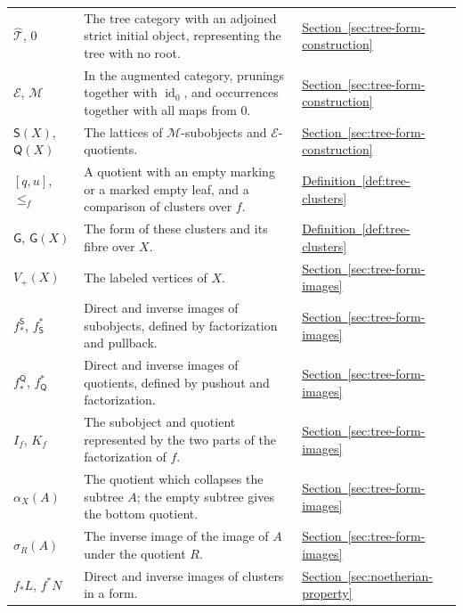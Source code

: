 \documentclass[11pt,a4paper]{article}
\theoremstyle{plain}
\theoremstyle{definition}
\theoremstyle{remark}
\newcommand{\id}{\operatorname{id}}
\begin{document}
\begin{longtable}{@{}>{\raggedright\arraybackslash}p{}
                    >{\raggedright\arraybackslash}p{}
                    >{\raggedright\arraybackslash}p{}@{}}
$\widehat{\mathcal T}$, $0$ & The tree category with an adjoined
  strict initial object, representing the tree with no root.
  & \hyperref[not:augmented-tree-category]{Section~\ref*{sec:tree-form-construction}}\\
$\mathcal E$, $\mathcal M$ & In the augmented category, prunings
  together with $\id_0$, and occurrences together with all maps
  from $0$.
  & \hyperref[not:augmented-tree-classes]{Section~\ref*{sec:tree-form-construction}}\\
$\mathsf S(X)$, $\mathsf Q(X)$ & The lattices of
  $\mathcal M$-subobjects and $\mathcal E$-quotients.
  & \hyperref[not:tree-subobjects-quotients]{Section~\ref*{sec:tree-form-construction}}\\
$[q,u]$, $\le_f$ & A quotient with an empty marking or a marked
  empty leaf, and a comparison of clusters over $f$.
  & \hyperref[def:tree-clusters]{Definition~\ref*{def:tree-clusters}}\\
$\mathsf G$, $\mathsf G(X)$ & The form of these clusters and its
  fibre over $X$.
  & \hyperref[def:tree-clusters]{Definition~\ref*{def:tree-clusters}}\\
$V_+(X)$ & The labeled vertices of $X$.
  & \hyperref[not:labeled-vertices]{Section~\ref*{sec:tree-form-images}}\\
$f_*^{\mathsf S}$, $f_{\mathsf S}^*$ & Direct and inverse images
  of subobjects, defined by factorization and pullback.
  & \hyperref[not:subobject-quotient-images]{Section~\ref*{sec:tree-form-images}}\\
$f_*^{\mathsf Q}$, $f_{\mathsf Q}^*$ & Direct and inverse images
  of quotients, defined by pushout and factorization.
  & \hyperref[not:subobject-quotient-images]{Section~\ref*{sec:tree-form-images}}\\
$I_f$, $K_f$ & The subobject and quotient represented by the
  two parts of the factorization of $f$.
  & \hyperref[not:matching-factor-parts]{Section~\ref*{sec:tree-form-images}}\\
$\alpha_X(A)$ & The quotient which collapses the subtree $A$;
  the empty subtree gives the bottom quotient.
  & \hyperref[not:subtree-collapse]{Section~\ref*{sec:tree-form-images}}\\
$\sigma_R(A)$ & The inverse image of the image of $A$ under
  the quotient $R$.
  & \hyperref[not:subtree-saturation]{Section~\ref*{sec:tree-form-images}}\\
$f_*L$, $f^*N$ & Direct and inverse images of clusters in a form.
  & \hyperref[not:cluster-images]{Section~\ref*{sec:noetherian-property}}\\

\end{longtable}
\end{document}

